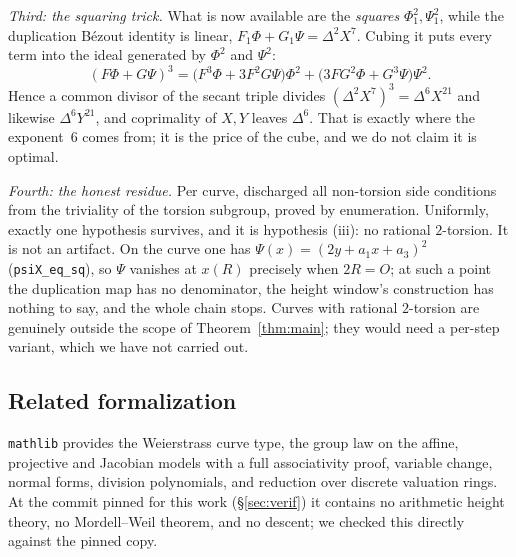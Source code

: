 \documentclass[11pt,reqno]{amsart}
\theoremstyle{plain}
\theoremstyle{definition}
\theoremstyle{remark}
\DeclareRobustCommand{\lt}[1]{\texttt{#1}}
\begin{document}
\emph{Third: the squaring trick.} What is now available are the
\emph{squares} $\Phi_1^2, \Psi_1^2$, while the duplication B\'ezout
identity is linear, $F_1\Phi + G_1\Psi = \Delta^2X^7$. Cubing it puts
every term into the ideal generated by $\Phi^2$ and $\Psi^2$:
\begin{equation}\label{eq:cube}
  (F\Phi + G\Psi)^3
   = \bigl(F^3\Phi + 3F^2G\Psi\bigr)\Phi^2
     + \bigl(3FG^2\Phi + G^3\Psi\bigr)\Psi^2 .
\end{equation}
Hence a common divisor of the secant triple divides
$(\Delta^2X^7)^3 = \Delta^6X^{21}$ and likewise $\Delta^6Y^{21}$, and
coprimality of $X,Y$ leaves $\Delta^6$. That is exactly where the
exponent~$6$ comes from; it is the price of the cube, and we do not
claim it is optimal.

\emph{Fourth: the honest residue.} Per curve, \cite{MW} discharged all
non-torsion side conditions from the triviality of the torsion
subgroup, proved by enumeration. Uniformly, exactly one hypothesis
survives, and it is hypothesis (iii): no rational $2$-torsion. It is not
an artifact. On the curve one has
$\Psi(x) = (2y + a_1x + a_3)^2$ (\lt{psiX\_eq\_sq}), so
$\Psi$ vanishes at $x(R)$ precisely when $2R = O$; at such a point the
duplication map has no denominator, the height window's construction has
nothing to say, and the whole chain stops. Curves with rational
$2$-torsion are genuinely outside the scope of Theorem~\ref{thm:main};
they would need a per-step variant, which we have not carried out.

\subsection{Related formalization}\label{sec:related}

\texttt{mathlib} \cite{mathlib} provides the Weierstrass curve type, the
group law on the affine, projective and Jacobian models with a full
associativity proof, variable change, normal forms, division
polynomials, and reduction over discrete valuation rings. At the commit
pinned for this work (\S\ref{sec:verif}) it contains no arithmetic
height theory, no Mordell--Weil theorem, and no descent; we checked this
directly against the pinned copy.
\end{document}
